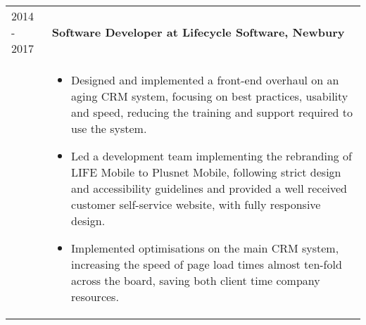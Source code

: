 \begin{tabular}{p{60pt}|p{11cm}}
    \hspace*{\fill}\textsc{2014 - 2017} & \textbf{Software Developer at Lifecycle Software, Newbury}          \\

    & \vspace{-0.9em}\begin{itemize}[itemsep=0pt,topsep=0pt,leftmargin=*]
                         \small
                         \item Designed and implemented a front-end overhaul on an aging CRM system, focusing on best practices, usability and speed, reducing the training and support required to use the system.
                         \item Led a development team implementing the rebranding of LIFE Mobile to Plusnet Mobile, following strict design and accessibility guidelines and provided a well received customer self-service website, with fully responsive design.
                         \item Implemented optimisations on the main CRM system, increasing the speed of page load times almost ten-fold across the board, saving both client time company resources.
    \end{itemize}

\end{tabular}
